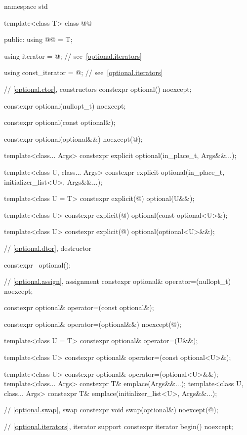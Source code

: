 \begin{codeblock}
namespace std {
  template<class T>
  class @@ {
  public:
    using @@ = T;

    using iterator = @\impdef@; // see~\ref{optional.iterators}

    using const_iterator = @\impdef@; // see~\ref{optional.iterators}

    // \ref{optional.ctor}, constructors
    constexpr optional() noexcept;

    constexpr optional(nullopt_t) noexcept;

    constexpr optional(const optional&);

    constexpr optional(optional&&) noexcept(@\seebelow@);

    template<class... Args> constexpr explicit optional(in_place_t, Args&&...);

    template<class U, class... Args>
    constexpr explicit optional(in_place_t, initializer_list<U>, Args&&...);

    template<class U = T> constexpr explicit(@\seebelow@) optional(U&&);

    template<class U> constexpr explicit(@\seebelow@) optional(const optional<U>&);

    template<class U> constexpr explicit(@\seebelow@) optional(optional<U>&&);

    // \ref{optional.dtor}, destructor

    constexpr ~optional();

    // \ref{optional.assign}, assignment
    constexpr optional& operator=(nullopt_t) noexcept;

    constexpr optional& operator=(const optional&);

    constexpr optional& operator=(optional&&) noexcept(@\seebelow@);

    template<class U = T> constexpr optional& operator=(U&&);

    template<class U> constexpr optional& operator=(const optional<U>&);

    template<class U> constexpr optional& operator=(optional<U>&&);
    template<class... Args> constexpr T& emplace(Args&&...);
    template<class U, class... Args>
    constexpr T& emplace(initializer_list<U>, Args&&...);

    // \ref{optional.swap}, swap
    constexpr void swap(optional&) noexcept(@\seebelow@);

    // \ref{optional.iterators}, iterator support
    constexpr iterator begin() noexcept;

}}
\end{codeblock}
